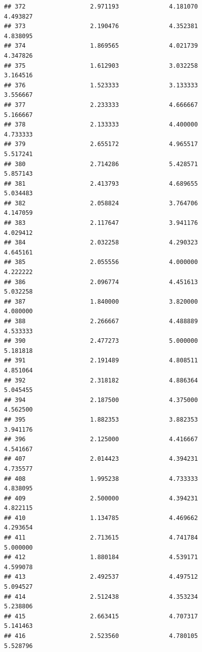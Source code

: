 \documentclass[]{article}
\begin{document}
\begin{verbatim}
## 372                  2.971193              4.181070                4.493827
## 373                  2.190476              4.352381                4.838095
## 374                  1.869565              4.021739                4.347826
## 375                  1.612903              3.032258                3.164516
## 376                  1.523333              3.133333                3.556667
## 377                  2.233333              4.666667                5.166667
## 378                  2.133333              4.400000                4.733333
## 379                  2.655172              4.965517                5.517241
## 380                  2.714286              5.428571                5.857143
## 381                  2.413793              4.689655                5.034483
## 382                  2.058824              3.764706                4.147059
## 383                  2.117647              3.941176                4.029412
## 384                  2.032258              4.290323                4.645161
## 385                  2.055556              4.000000                4.222222
## 386                  2.096774              4.451613                5.032258
## 387                  1.840000              3.820000                4.080000
## 388                  2.266667              4.488889                4.533333
## 390                  2.477273              5.000000                5.181818
## 391                  2.191489              4.808511                4.851064
## 392                  2.318182              4.886364                5.045455
## 394                  2.187500              4.375000                4.562500
## 395                  1.882353              3.882353                3.941176
## 396                  2.125000              4.416667                4.541667
## 407                  2.014423              4.394231                4.735577
## 408                  1.995238              4.733333                4.838095
## 409                  2.500000              4.394231                4.822115
## 410                  1.134785              4.469662                4.293654
## 411                  2.713615              4.741784                5.000000
## 412                  1.880184              4.539171                4.599078
## 413                  2.492537              4.497512                5.094527
## 414                  2.512438              4.353234                5.238806
## 415                  2.663415              4.707317                5.141463
## 416                  2.523560              4.780105                5.528796

\end{verbatim}
\end{document}
